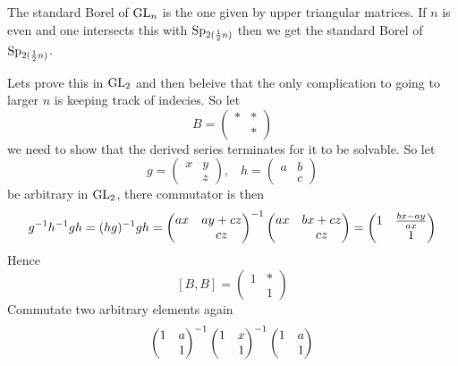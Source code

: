     \begin{example}
        The standard Borel of \(\operatorname{GL}_n\) is the one given by upper triangular matrices. If \(n\) is even and one intersects this with \(\operatorname{Sp}_{2(\frac{1}{2}n)}\) then we get the standard Borel of \(\operatorname{Sp}_{2(\frac{1}{2}n)}\).

        Lets prove this in \(\operatorname{GL}_2\) and then beleive that the only complication to going to larger \(n\) is keeping track of indecies. So let 
        \[B = \begin{pmatrix}
            \ast & \ast \\
             & \ast
        \end{pmatrix}\]
        we need to show that the derived series terminates for it to be solvable. So let 
        \[g = \begin{pmatrix}
            x & y\\
             & z
        \end{pmatrix}, \;\;\; h = \begin{pmatrix}
            a & b \\
            & c
        \end{pmatrix}\]
        be arbitrary in \(\operatorname{GL}_2\), there commutator is then 
        \[g^{-1} h^{-1} gh = (hg)^{-1} gh = \begin{pmatrix}
        ax & ay + cz \\ & cz
        \end{pmatrix}^{-1} \begin{pmatrix}
            ax & bx + cz\\ & cz
        \end{pmatrix} = \begin{pmatrix}
            1 & \frac{bx - ay}{ax} \\ & 1
        \end{pmatrix} \]
        Hence
        \[[B, B] = \begin{pmatrix}
            1 & \ast \\ & 1
        \end{pmatrix}\]
        Commutate two arbitrary elements again 
        \[\begin{pmatrix}
            1 & a \\ & 1
        \end{pmatrix}^{-1}\begin{pmatrix}
            1 & x \\ & 1
        \end{pmatrix}^{-1} \begin{pmatrix}
            1 & a \\ & 1

\end{pmatrix}\]
\end{example}
